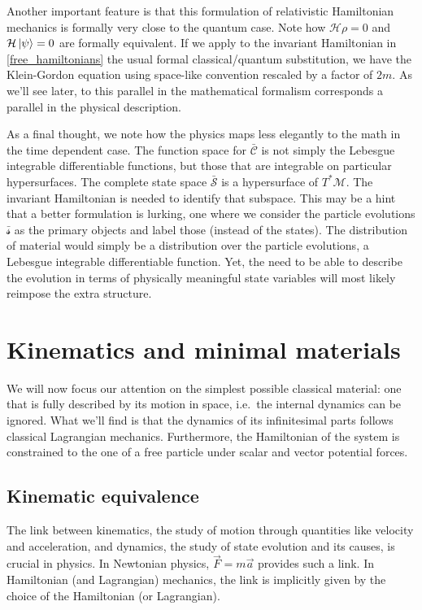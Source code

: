 \documentclass[smallextended]{svjour3}
\numberwithin{equation}{section}
\theoremstyle{definition}
\begin{document}
Another important feature is that this formulation of relativistic Hamiltonian mechanics is formally very close to the quantum case. Note how $\mathcal{H} \rho = 0$ and $\mathcal{H} \ket{\psi} = 0$ are formally equivalent. If we apply to the invariant Hamiltonian in \ref{free_hamiltonians} the usual formal classical/quantum substitution, we have the Klein-Gordon equation using space-like convention rescaled by a factor of $2m$. As we'll see later, to this parallel in the mathematical formalism corresponds a parallel in the physical description.

As a final thought, we note how the physics maps less elegantly to the math in the time dependent case. The function space for $\bar{\mathcal{C}}$ is not simply the Lebesgue integrable differentiable functions, but those that are integrable on particular hypersurfaces. The complete state space $\bar{\mathcal{S}}$ is a hypersurface of $T^*\mathcal{M}$. The invariant Hamiltonian is needed to identify that subspace. This may be a hint that a better formulation is lurking, one where we consider the particle evolutions $\bar{\mathcal{s}}$ as the primary objects and label those (instead of the states). The distribution of material would simply be a distribution over the particle evolutions, a Lebesgue integrable differentiable function. Yet, the need to be able to describe the evolution in terms of physically meaningful state variables will most likely reimpose the extra structure.

\section{Kinematics and minimal materials}
\label{sec:Lagrangian}

We will now focus our attention on the simplest possible classical material: one that is fully described by its motion in space, i.e.~the internal dynamics can be ignored. What we'll find is that the dynamics of its infinitesimal parts follows classical Lagrangian mechanics. Furthermore, the Hamiltonian of the system is constrained to the one of a free particle under scalar and vector potential forces.

\subsection{Kinematic equivalence}

The link between kinematics, the study of motion through quantities like velocity and acceleration, and dynamics, the study of state evolution and its causes, is crucial in physics. In Newtonian physics, $\vec{F}=m\vec{a}$ provides such a link. In Hamiltonian (and Lagrangian) mechanics, the link is implicitly given by the choice of the Hamiltonian (or Lagrangian).
\end{document}
